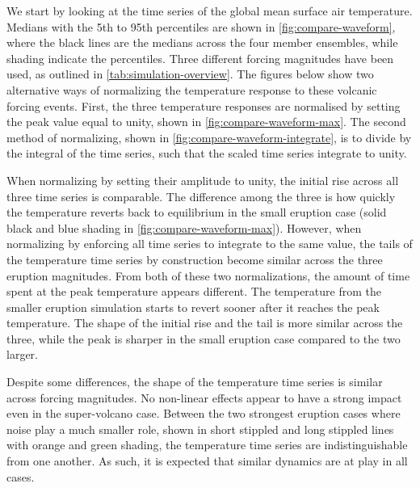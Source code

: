 \documentclass{ametsocV5}
\begin{document}
We start by looking at the time series of the global mean surface air temperature.
Medians with the 5th to 95th percentiles are shown in \cref{fig:compare-waveform}, where
the black lines are the medians across the four member ensembles, while shading indicate
the percentiles. Three different forcing magnitudes have been used, as outlined in
\cref{tab:simulation-overview}. The figures below show two alternative ways of
normalizing the temperature response to these volcanic forcing events. First, the three
temperature responses are normalised by setting the peak value equal to unity, shown in
\cref{fig:compare-waveform-max}. The second method of normalizing, shown in
\cref{fig:compare-waveform-integrate}, is to divide by the integral of the time series,
such that the scaled time series integrate to unity.

When normalizing by setting their amplitude to unity, the initial rise across all three
time series is comparable. The difference among the three is how quickly the temperature
reverts back to equilibrium in the small eruption case (solid black and blue shading in
\cref{fig:compare-waveform-max}). However, when normalizing by enforcing all time series
to integrate to the same value, the tails of the temperature time series by construction
become similar across the three eruption magnitudes. From both of these two
normalizations, the amount of time spent at the peak temperature appears different. The
temperature from the smaller eruption simulation starts to revert sooner after it
reaches the peak temperature. The shape of the initial rise and the tail is more similar
across the three, while the peak is sharper in the small eruption case compared to the
two larger.

Despite some differences, the shape of the temperature time series is similar across
forcing magnitudes. No non-linear effects appear to have a strong impact even in the
super-volcano case. Between the two strongest eruption cases where noise play a much
smaller role, shown in short stippled and long stippled lines with orange and green
shading, the temperature time series are indistinguishable from one another. As such, it
is expected that similar dynamics are at play in all cases.

\end{document}
